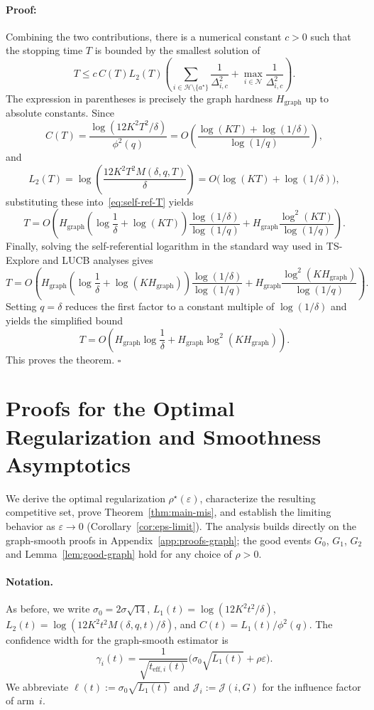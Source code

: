 \documentclass{article}
\newenvironment{proof}{\paragraph{Proof:}}{\hfill$\square$}
\begin{document}
\begin{proof}
Combining the two contributions, there is a numerical constant $c>0$ such that the stopping time $T$ is bounded by the smallest solution of
\begin{equation}
\label{eq:self-ref-T}
T
\le
c\,C(T)L_2(T)
\left(
\sum_{i\in\mathcal H\setminus\{a^\star\}}\frac{1}{\Delta_{i,c}^2}
+
\max_{i\in\mathcal N}\frac{1}{\Delta_{i,c}^2}
\right).
\end{equation}
The expression in parentheses is precisely the graph hardness $H_{\mathrm{graph}}$ up to absolute constants. Since
\[
C(T)=\frac{\log(12K^2T^2/\delta)}{\phi^2(q)}
= O\!\left(\frac{\log(KT)+\log(1/\delta)}{\log(1/q)}\right),
\]
and
\[
L_2(T)=\log\!\left(\frac{12K^2T^2M(\delta,q,T)}{\delta}\right)
= O\!\bigl(\log(KT)+\log(1/\delta)\bigr),
\]
substituting these into~\eqref{eq:self-ref-T} yields
\[
T
=
O\!\left(
H_{\mathrm{graph}}
\left(\log\frac1\delta+\log(KT)\right)
\frac{\log(1/\delta)}{\log(1/q)}
+
H_{\mathrm{graph}}
\frac{\log^2(KT)}{\log(1/q)}
\right).
\]
Finally, solving the self-referential logarithm in the standard way used in TS-Explore and LUCB analyses gives
\[
T
=
O\!\left(
H_{\mathrm{graph}}
\left(\log\frac1\delta+\log(KH_{\mathrm{graph}})\right)
\frac{\log(1/\delta)}{\log(1/q)}
+
H_{\mathrm{graph}}
\frac{\log^2(KH_{\mathrm{graph}})}{\log(1/q)}
\right).
\]
Setting $q=\delta$ reduces the first factor to a constant multiple of $\log(1/\delta)$ and yields the simplified bound
\[
T
=
O\!\left(
H_{\mathrm{graph}}\log\frac1\delta
+
H_{\mathrm{graph}}\log^2(KH_{\mathrm{graph}})
\right).
\]
This proves the theorem.
\end{proof}

\section{Proofs for the Optimal Regularization and Smoothness Asymptotics}
\label{app:proofs-misspecified}

We derive the optimal regularization $\rho^\star(\varepsilon)$, characterize the
resulting competitive set, prove Theorem~\ref{thm:main-mis}, and establish the
limiting behavior as $\varepsilon\to 0$ (Corollary~\ref{cor:eps-limit}). The
analysis builds directly on the graph-smooth proofs in
Appendix~\ref{app:proofs-graph}; the good events $G_0$, $G_1$, $G_2$ and
Lemma~\ref{lem:good-graph} hold for any choice of $\rho>0$.

\paragraph{Notation.}
As before, we write $\sigma_0=2\sigma\sqrt{14}$,
$L_1(t)=\log(12K^2t^2/\delta)$,
$L_2(t)=\log(12K^2t^2M(\delta,q,t)/\delta)$, and $C(t)=L_1(t)/\phi^2(q)$.
The confidence width for the graph-smooth estimator is
\[
\gamma_i(t)
=
\frac{1}{\sqrt{t_{\mathrm{eff},i}(t)}}
\bigl(\sigma_0\sqrt{L_1(t)}+\rho\varepsilon\bigr).
\]
We abbreviate $\ell(t):=\sigma_0\sqrt{L_1(t)}$ and
$\mathcal J_i:=\mathcal J(i,G)$ for the influence factor of arm~$i$.
\end{document}
